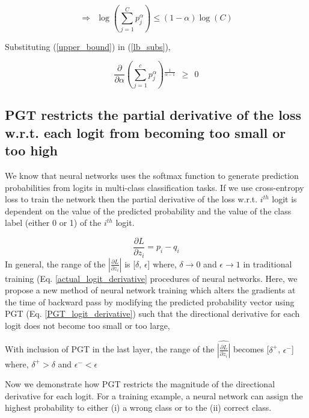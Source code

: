 \documentclass[runningheads]{llncs}
\begin{document}
\begin{equation}\Rightarrow\ \ \log \left(\sum _{j=1}^C p_j^{\alpha}\right)\leq
(1-\alpha ) \log (C) \label{upper_bound} \end{equation}

Substituting (\ref{upper_bound}) in (\ref{lb_subs}),

\begin{equation} \frac{\partial}{\partial \alpha
}\left(\sum _{j=1}^c p_j^{\alpha}\right){}^{\frac{1}{\alpha -1}}\ \ \geq \ \ 0
\end{equation}



\clearpage

\subsection{PGT restricts the partial derivative of the loss w.r.t. each logit from becoming too small or too high}
\label{sec:pgt_logit_derivative}

We know that neural networks uses the softmax function to generate prediction
probabilities from logits in multi-class classification tasks. If we use cross-entropy
loss to train the network then the partial derivative of the loss w.r.t. $i^{th}$ logit
is dependent on the value of the predicted probability and the value of the class label
(either 0 or 1) of the $i^{th}$ logit. 

\begin{equation}
\label{actual_logit_derivative}
\frac{\partial L}{\partial z_i} = p_i -q_i
\end{equation}
In general, the range of the $|\frac{\partial L}{\partial z_i}|$ is [$\delta$,
$\epsilon$] where, $\delta\rightarrow 0$ and $\epsilon\rightarrow 1$ in traditional
training (Eq. \ref{actual_logit_derivative} procedures of neural networks. Here, we
propose a new method of neural network training which alters the gradients at the time
of backward pass by modifying the predicted probability vector using PGT (Eq.
\ref{PGT_logit_derivative}) such that the directional derivative for each logit does not
become too small or too large,


With inclusion of PGT in the last layer, the range of the $\widehat{|\frac{\partial
L}{\partial z_i}|}$ becomes [$\delta^+$, $\epsilon^-$] where, $\delta^+>\delta$ and
$\epsilon^-<\epsilon$


Now we demonstrate how PGT restricts the magnitude of the directional derivative for
each logit. For a training example, a neural network can assign the highest probability
to either (i) a wrong class or to the (ii) correct class. 
\end{document}
